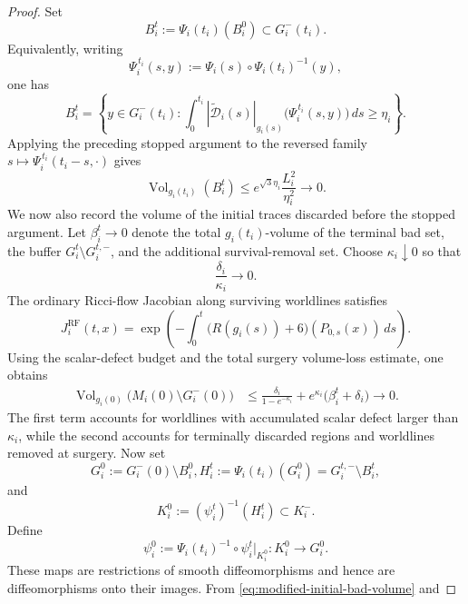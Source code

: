 \documentclass[10pt,a4paper]{amsart}
\begin{document}
\begin{proof}
\noindent
Set
\[
        B_i^t:=\Psi_i(t_i)(B_i^0)\subset G_i^-(t_i).
\]
Equivalently, writing
\[
        \Psi_i^{\,t_i}(s,y)
        :=
        \Psi_i(s)\circ\Psi_i(t_i)^{-1}(y),
\]
one has
\[
        B_i^t
        =
        \left\{
        y\in G_i^-(t_i):
        \int_0^{t_i}
        |\widetilde{\mathcal D}_i(s)|_{g_i(s)}
        \bigl(\Psi_i^{\,t_i}(s,y)\bigr)\,ds
        \geq\eta_i
        \right\}.
\]
Applying the preceding stopped argument to the reversed family
\(s\mapsto\Psi_i^{\,t_i}(t_i-s,\cdot)\) gives
\begin{equation}
\label{eq:modified-terminal-bad-volume}
        \operatorname{Vol}_{g_i(t_i)}(B_i^t)
        \leq
        e^{\sqrt{3}\eta_i}
        \frac{L_i^2}{\eta_i^2}
        \longrightarrow0 .
\end{equation}
We now also record the volume of the initial traces discarded before the
stopped argument. Let \(\beta_i^t\to0\) denote the total
\(g_i(t_i)\)-volume of the terminal bad set, the buffer
\(G_i^t\setminus G_i^{t,-}\), and the additional survival-removal set.
Choose \(\kappa_i\downarrow0\) so that
\[
        \frac{\delta_i}{\kappa_i}\to0.
\]
The ordinary Ricci-flow Jacobian along surviving worldlines satisfies
\[
        J_i^{\mathrm{RF}}(t,x)
        =
        \exp\left(
        -\int_0^t
        \bigl(R(g_i(s))+6\bigr)(P_{0,s}(x))\,ds
        \right).
\]
Using the scalar-defect budget and the total surgery volume-loss
estimate, one obtains
\begin{equation}
\label{eq:initial-trace-volume}
\begin{aligned}
        \operatorname{Vol}_{g_i(0)}
        \bigl(M_i(0)\setminus G_i^-(0)\bigr)
        &\leq
        \frac{\delta_i}{1-e^{-\kappa_i}}
        +
        e^{\kappa_i}\bigl(\beta_i^t+\delta_i\bigr)
        \longrightarrow0.
\end{aligned}
\end{equation}
The first term accounts for worldlines with accumulated scalar defect
larger than \(\kappa_i\), while the second accounts for terminally
discarded regions and worldlines removed at surgery. Now set
\[
        G_i^0:=G_i^-(0)\setminus B_i^0,
        H_i^t:=\Psi_i(t_i)(G_i^0)
        =
        G_i^{t,-}\setminus B_i^t,
\]
and
\[
        K_i^0:=(\psi_i^t)^{-1}(H_i^t)\subset K_i^-.
\]
Define
\[
        \psi_i^0
        :=
        \Psi_i(t_i)^{-1}\circ
        \psi_i^t\big|_{K_i^0}
        :
        K_i^0\longrightarrow G_i^0.
\]
These maps are restrictions of smooth diffeomorphisms and hence are
diffeomorphisms onto their images. From
\eqref{eq:modified-initial-bad-volume} and

\end{proof}
\end{document}
